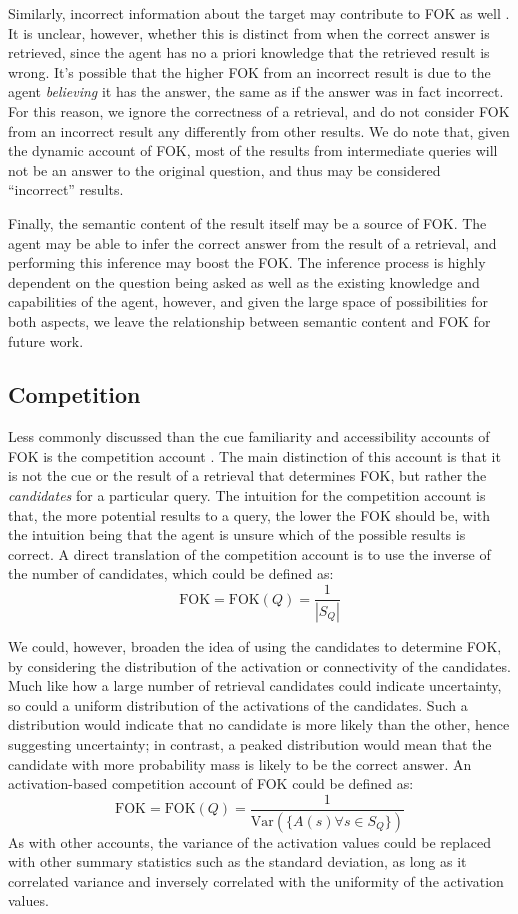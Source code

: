 \documentclass[10pt,letterpaper]{article}
\newcommand{\fok}[0]{\text{FOK}}
\begin{document}
Similarly, incorrect information about the target may contribute to FOK as well \cite{Koriat1993HowDoWe}.
It is unclear, however, whether this is distinct from when the correct answer is retrieved, since the agent has no a priori knowledge that the retrieved result is wrong.
It's possible that the higher FOK from an incorrect result is due to the agent \textit{believing} it has the answer, the same as if the answer was in fact incorrect.
For this reason, we ignore the correctness of a retrieval, and do not consider FOK from an incorrect result any differently from other results.
We do note that, given the dynamic account of FOK, most of the results from intermediate queries will not be an answer to the original question, and thus may be considered ``incorrect'' results. %

Finally, the semantic content of the result itself may be a source of FOK.
The agent may be able to infer the correct answer from the result of a retrieval, and performing this inference may boost the FOK.
The inference process is highly dependent on the question being asked as well as the existing knowledge and capabilities of the agent, however, and given the large space of possibilities for both aspects, we leave the relationship between semantic content and FOK for future work.

\subsection{Competition}

Less commonly discussed than the cue familiarity and accessibility accounts of FOK is the competition account \cite{Schreiber1998TheRelationBetween}.
The main distinction of this account is that it is not the cue or the result of a retrieval that determines FOK, but rather the \textit{candidates} for a particular query.
The intuition for the competition account is that, the more potential results to a query, the lower the FOK should be, with the intuition being that the agent is unsure which of the possible results is correct.
A direct translation of the competition account is to use the inverse of the number of candidates, which could be defined as:
$$\fok = \fok(Q) = \frac{1}{|S_Q|}$$

We could, however, broaden the idea of using the candidates to determine FOK, by considering the distribution of the activation or connectivity of the candidates.
Much like how a large number of retrieval candidates could indicate uncertainty, so could a uniform distribution of the activations of the candidates.
Such a distribution would indicate that no candidate is more likely than the other, hence suggesting uncertainty; in contrast, a peaked distribution would mean that the candidate with more probability mass is likely to be the correct answer.
An activation-based competition account of FOK could be defined as:
$$\fok = \fok(Q) = \frac{1}{\text{Var}(\{A(s) \forall s \in S_Q\})}$$ %
As with other accounts, the variance of the activation values could be replaced with other summary statistics such as the standard deviation, as long as it correlated variance and inversely correlated with the uniformity of the activation values.
\end{document}
